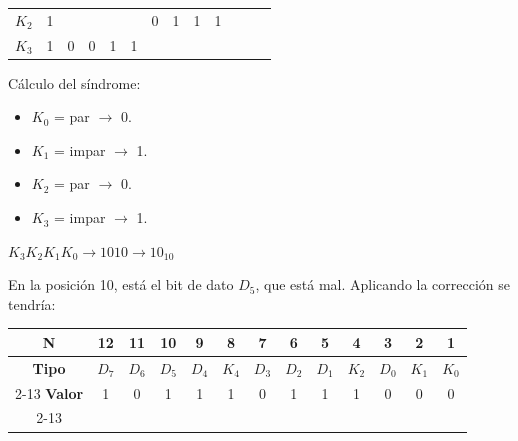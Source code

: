 \begin{center}
\begin{tabular}{ccccccccccccc}
\cellcolor[HTML]{9AFF99}$K_2$          & \cellcolor[HTML]{96FFFB}1 &                           &                           &                           &                           & \cellcolor[HTML]{96FFFB}0 & \cellcolor[HTML]{96FFFB}1 & \cellcolor[HTML]{96FFFB}1 & \cellcolor[HTML]{96FFFB}1 &                           &                           &                           \\
\cellcolor[HTML]{9AFF99}$K_3$          & \cellcolor[HTML]{96FFFB}1 & \cellcolor[HTML]{96FFFB}0 & \cellcolor[HTML]{96FFFB}0 & \cellcolor[HTML]{96FFFB}1 & \cellcolor[HTML]{96FFFB}1 &                           &                           &                           &                           &                           &                           &                          
\end{tabular}
\end{center}
\noindent{} Cálculo del síndrome:
\begin{itemize}[nosep]
    \item $K_0$ = par $\rightarrow$ 0.
    \item $K_1$ = impar $\rightarrow$ 1. 
    \item $K_2$ = par $\rightarrow$ 0.
    \item $K_3$ = impar $\rightarrow$ 1.
\end{itemize}
\begin{center}\Large
    $K_3 K_2 K_1 K_0 \rightarrow 1010 \rightarrow 10_{10}$
\end{center}
\noindent{} En la posición 10, está el bit de dato $D_5$, que está mal. Aplicando la corrección se tendría:
\begin{center}
\begin{tabular}{ccccccccccccc}
\rowcolor[HTML]{FFFFC7} 
\cellcolor[HTML]{FCFF2F}\textbf{N}     & 12    & 11    & 10    & 9     & 8     & 7     & 6     & 5     & 4     & 3     & 2     & 1     \\ \hline
\rowcolor[HTML]{CBCEFB} 
\cellcolor[HTML]{9698ED}\textbf{Tipo}  & $D_7$ & $D_6$ & $D_5$ & $D_4$ & $K_4$ & $D_3$ & $D_2$ & $D_1$ & $K_2$ & $D_0$ & $K_1$ & $K_0$ \\ \cline{2-13} 
\rowcolor[HTML]{FFCCC9} 
\cellcolor[HTML]{FD6864}\textbf{Valor} & 1     & 0     & 1     & 1     & 1     & 0     & 1     & 1     & 1     & 0     & 0     & 0     \\ \cline{2-13} 
\end{tabular}
\end{center}

